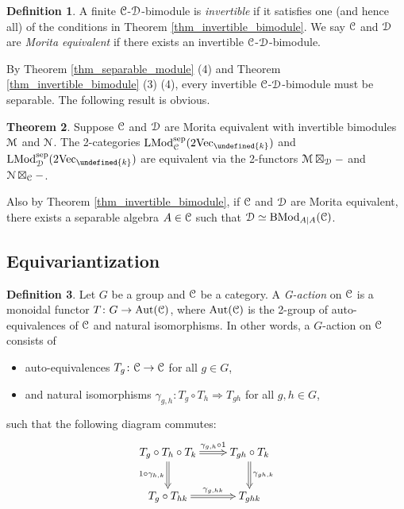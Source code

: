 \documentclass[10pt]{article}
\let\mathbb\undefined
\theoremstyle{definition}
\newtheorem{thm}{Theorem}[section]
\newtheorem{defn}[thm]{Definition}
\numberwithin{equation}{section}
\numberwithin{thm}{section}
\newcommand{\bit}{\begin{itemize}}
\newcommand{\eit}{\end{itemize}}
\newcommand{\bk}{\mathbb{k}}
\newcommand{\CC}{\EuScript{C}}
\newcommand{\CD}{\EuScript{D}}
\newcommand{\CM}{\EuScript{M}}
\newcommand{\CN}{\EuScript{N}}
\DeclareMathOperator{\Aut}{Aut}
\DeclareMathOperator{\LMod}{LMod}
\DeclareMathOperator{\BMod}{BMod}
\newcommand{\vect}{\mathrm{Vec}}
\newcommand{\sep}{\mathrm{sep}}
\begin{document}
\begin{defn}
A finite $\CC$-$\CD$-bimodule is \emph{invertible} if it satisfies one (and hence all) of the conditions in Theorem \ref{thm_invertible_bimodule}. We say $\CC$ and $\CD$ are \emph{Morita equivalent} if there exists an invertible $\CC$-$\CD$-bimodule.
\end{defn}

By Theorem \ref{thm_separable_module} (4) and Theorem \ref{thm_invertible_bimodule} (3) (4), every invertible $\CC$-$\CD$-bimodule must be separable. The following result is obvious.

\begin{thm} \label{thm_Morita_equivalent_defined_by_2-category}
Suppose $\CC$ and $\CD$ are Morita equivalent with invertible bimodules $\CM$ and $\CN$. The 2-categories $\LMod_\CC^\sep(2\vect_\bk)$ and $\LMod_\CD^\sep(2\vect_\bk)$ are equivalent via the 2-functors $\CM \boxtimes_\CD -$ and $\CN \boxtimes_\CC -$.
\end{thm}

Also by Theorem \ref{thm_invertible_bimodule}, if $\CC$ and $\CD$ are Morita equivalent, there exists a separable algebra $A \in \CC$ such that $\CD \simeq \BMod_{A|A}(\CC)$.

\subsection{Equivariantization}

\begin{defn}
Let $G$ be a group and $\CC$ be a category. A \emph{G-action} on $\CC$ is a monoidal functor $T \colon G \to \Aut(\CC)$, where $\Aut(\CC)$ is the 2-group of auto-equivalences of $\CC$ and natural isomorphisms. In other words, a $G$-action on $\CC$ consists of
\bit
\item auto-equivalences $T_g \colon \CC \to \CC$ for all $g \in G$,
\item and natural isomorphisms $\gamma_{g,h} \colon T_g \circ T_h \Rightarrow T_{gh}$ for all $g,h \in G$,
\eit
such that the following diagram commutes:
\[
\xymatrix{
T_g \circ T_h \circ T_k \ar@{=>}[r]^-{\gamma_{g,h} \circ 1} \ar@{=>}[d]_{1 \circ \gamma_{h,k}} & T_{gh} \circ T_k \ar@{=>}[d]^{\gamma_{gh,k}} \\
T_g \circ T_{hk} \ar@{=>}[r]^-{\gamma_{g,hk}} & T_{ghk}
}
\]
\end{defn}
\end{document}
